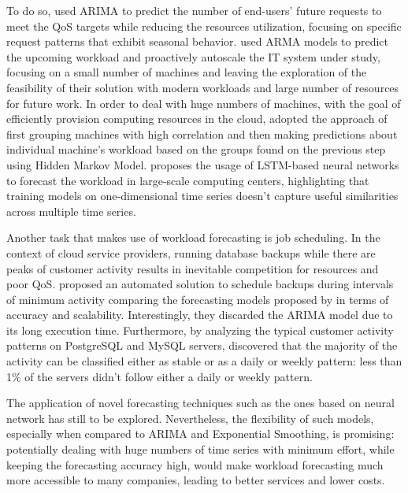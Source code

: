 \documentclass[a4paper, 12pt]{article} %
\begin{document}
	To do so, \cite{ArimaWorkloadPrediction} used ARIMA to predict the number of end-users' future requests to meet the QoS targets while reducing the resources utilization, focusing on specific request patterns that exhibit seasonal behavior. \cite{ArmaAutoscaling} used ARMA models to predict the upcoming workload and proactively autoscale the IT system under study, focusing on a small number of machines and leaving the exploration of the feasibility of their solution with modern workloads and large number of resources for future work.
	In order to deal with huge numbers of machines, with the goal of efficiently provision computing resources in the cloud, \cite{WorkloadCharacterizationAndPrediction} adopted the approach of first grouping machines with high correlation and then making predictions about individual machine's workload based on the groups found on the previous step using Hidden Markov Model. 
	\cite{LSTMLargeScaleWorkloadForecasting} proposes the usage of LSTM-based neural networks to forecast the workload in large-scale computing centers, highlighting that training models on one-dimensional time series doesn't capture useful similarities across multiple time series. 
	
	Another task that makes use of workload forecasting is job scheduling. In the context of cloud service providers, running database backups while there are peaks of customer activity results in inevitable competition for resources and poor QoS. \cite{Seagull} proposed an automated solution to schedule backups during intervals of minimum activity comparing the forecasting models proposed by \cite{MicrosoftSSA, GluonTS, FacebookProphet} in terms of accuracy and scalability. Interestingly, they discarded the ARIMA model due to its long execution time. Furthermore, by analyzing the typical customer activity patterns on PostgreSQL and MySQL servers, \cite{Seagull} discovered that the majority of the activity can be classified either as stable or as a daily or weekly pattern: less than 1\% of the servers didn't follow either a daily or weekly pattern.
	
	The application of novel forecasting techniques such as the ones based on neural network has still to be explored. Nevertheless, the flexibility of such models, especially when compared to ARIMA and Exponential Smoothing, is promising: potentially dealing with huge numbers of time series with minimum effort, while keeping the forecasting accuracy high, would make workload forecasting much more accessible to many companies, leading to better services and lower costs.
	
\end{document}
